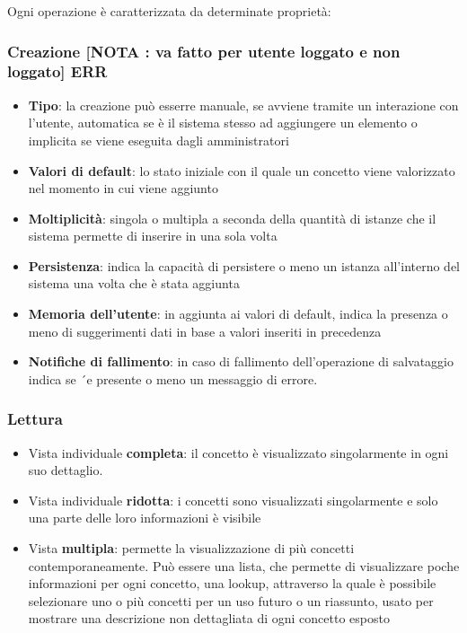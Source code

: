 \documentclass[12pt,italian,]{report}
\providecommand{\tightlist}{%
  \setlength{\itemsep}{0pt}\setlength{\parskip}{0pt}}
\begin{document}
Ogni operazione è caratterizzata da determinate proprietà:

\hypertarget{creazione-nota-va-fatto-per-utente-loggato-e-non-loggato-err}{%
\subsubsection{Creazione {[}NOTA : va fatto per utente loggato e non
loggato{]}
ERR}\label{creazione-nota-va-fatto-per-utente-loggato-e-non-loggato-err}}

\begin{itemize}
\tightlist
\item
  \textbf{Tipo}: la creazione può esserre manuale, se avviene tramite un
  interazione con l'utente, automatica se è il sistema stesso ad
  aggiungere un elemento o implicita se viene eseguita dagli
  amministratori
\item
  \textbf{Valori di default}: lo stato iniziale con il quale un concetto
  viene valorizzato nel momento in cui viene aggiunto
\item
  \textbf{Moltiplicità}: singola o multipla a seconda della quantità di
  istanze che il sistema permette di inserire in una sola volta
\item
  \textbf{Persistenza}: indica la capacità di persistere o meno un
  istanza all'interno del sistema una volta che è stata aggiunta
\item
  \textbf{Memoria dell'utente}: in aggiunta ai valori di default, indica
  la presenza o meno di suggerimenti dati in base a valori inseriti in
  precedenza
\item
  \textbf{Notifiche di fallimento}: in caso di fallimento
  dell'operazione di salvataggio indica se ´e presente o meno un
  messaggio di errore.
\end{itemize}

\hypertarget{lettura}{%
\subsubsection{Lettura}\label{lettura}}

\begin{itemize}
\tightlist
\item
  Vista individuale \textbf{completa}: il concetto è visualizzato
  singolarmente in ogni suo dettaglio.
\item
  Vista individuale \textbf{ridotta}: i concetti sono visualizzati
  singolarmente e solo una parte delle loro informazioni è visibile
\item
  Vista \textbf{multipla}: permette la visualizzazione di più concetti
  contemporaneamente. Può essere una lista, che permette di visualizzare
  poche informazioni per ogni concetto, una lookup, attraverso la quale
  è possibile selezionare uno o più concetti per un uso futuro o un
  riassunto, usato per mostrare una descrizione non dettagliata di ogni
  concetto esposto
\end{itemize}
\end{document}
